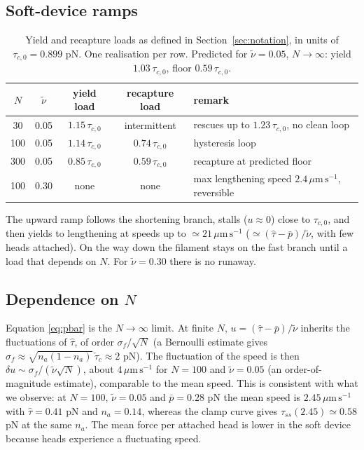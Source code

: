 \documentclass[11pt,a4paper]{article}
\newcommand{\umps}{\,\mu\mathrm{m\,s^{-1}}}
\newcommand{\tauz}{\tau_{c,0}}
\begin{document}
\subsection{Soft-device ramps}
\begin{table}[h]
\centering
\begin{tabular}{ccccp{5.2cm}}
\toprule
$N$ & $\tilde\nu$ & yield load & recapture load & remark \\
\midrule
30  & 0.05 & $1.15\,\tauz$ & intermittent & rescues up to $1.23\,\tauz$, no clean loop \\
100 & 0.05 & $1.14\,\tauz$ & $0.74\,\tauz$ & hysteresis loop \\
300 & 0.05 & $0.85\,\tauz$ & $0.59\,\tauz$ & recapture at predicted floor \\
100 & 0.30 & none & none & max lengthening speed $2.4\umps$, reversible \\
\bottomrule
\end{tabular}
\caption{Yield and recapture loads as defined in Section~\ref{sec:notation}, in units of $\tauz=0.899$ pN. One realisation per row. Predicted for $\tilde\nu=0.05$, $N\to\infty$: yield $1.03\,\tauz$, floor $0.59\,\tauz$.}
\end{table}

The upward ramp follows the shortening branch, stalls ($u\approx0$) close to $\tauz$, and then yields to lengthening at speeds up to $\simeq21\umps$ ($\simeq(\hat\tau-\bar p)/\tilde\nu$, with few heads attached). On the way down the filament stays on the fast branch until a load that depends on $N$. For $\tilde\nu=0.30$ there is no runaway.

\subsection{Dependence on $N$}
Equation \eqref{eq:pbar} is the $N\to\infty$ limit. At finite $N$, $u=(\hat\tau-\bar p)/\tilde\nu$ inherits the fluctuations of $\hat\tau$, of order $\sigma_f/\sqrt N$ (a Bernoulli estimate gives $\sigma_f\approx\sqrt{n_a(1-n_a)}\,\check\tau_c\approx2$ pN). The fluctuation of the speed is then $\delta u\sim\sigma_f/(\tilde\nu\sqrt N)$, about $4\umps$ for $N=100$ and $\tilde\nu=0.05$ (an order-of-magnitude estimate), comparable to the mean speed. This is consistent with what we observe: at $N=100$, $\tilde\nu=0.05$ and $\bar p=0.28$ pN the mean speed is $2.45\umps$ with $\hat\tau=0.41$ pN and $n_a=0.14$, whereas the clamp curve gives $\tau_{ss}(2.45)\simeq0.58$ pN at the same $n_a$. The mean force per attached head is lower in the soft device because heads experience a fluctuating speed.
\end{document}
